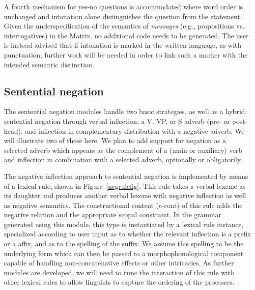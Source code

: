\documentclass[11pt]{article}
\begin{document}
A fourth mechanism for yes-no questions is accommodated where word order is
unchanged and intonation alone distinguishes the question from the statement.
Given the underspecification of the semantics of {\it messages} (e.g.,
propositions vs. interrogatives) in the Matrix, no additional code needs to
be generated.  The user is instead advised that if intonation is marked in 
the written language, as with punctuation, further work will be needed in order
to link such a marker with the intended semantic distinction.

\subsection{Sentential negation}

The sentential negation modules handle two basic strategies, as well
as a hybrid: sentential negation through verbal inflection; a V,
VP, or S adverb (pre- or post-head); and inflection in complementary
distribution with a negative adverb. We will illustrate two of these
here.  We plan to add support for negation as a
selected adverb which appears as the complement of a (main or auxiliary) verb 
and inflection in combination with a selected adverb,
optionally or obligatorily.

The negative inflection approach to sentential negation is implemented
by means of a lexical rule, shown in Figure~\ref{negrulefig}.  This
rule takes a verbal lexeme as its daughter and produces another verbal
lexeme with negative inflection as well as negative semantics.  The
constructional content ({\sc c-cont}) of this rule adds the negative
relation and the appropriate scopal constraint.
In the grammar generated using this module,
this type is instantiated by a lexical rule instance, specialized
according to user input as to whether the relevant inflection is a
prefix or a affix, and as to the spelling of the suffix.  We assume
this spelling to be the underlying form which can then be passed to a
morphophonological component capable of handling non-concatenative
effects or other intricacies.  As further modules are developed, we
will need to tune the interaction of this rule with other lexical
rules to allow linguists to capture the ordering of the
processes.
\end{document}
